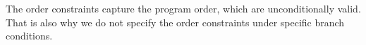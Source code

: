 The order constraints capture the program order, which are unconditionally valid. That is also why we do not specify the order constraints under specific branch conditions. 





